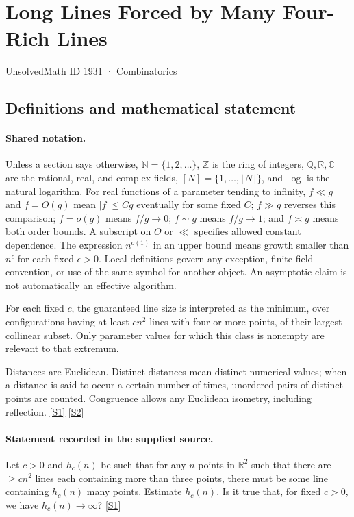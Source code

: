 \documentclass[11pt,a4paper]{article}
\newcommand{\N}{\mathbb{N}}
\newcommand{\Z}{\mathbb{Z}}
\newcommand{\Q}{\mathbb{Q}}
\newcommand{\R}{\mathbb{R}}
\newcommand{\C}{\mathbb{C}}
\newcommand{\sref}[2]{\hyperlink{source:#1:#2}{[S#2]}}
\begin{document}

\setcounter{section}{1930}

\section{Long Lines Forced by Many Four-Rich Lines}\label{1931}

{\small\sffamily UnsolvedMath ID 1931 · Combinatorics}

\subsection{Definitions and mathematical statement}

\paragraph{Shared notation.}Unless a section says otherwise, $\N=\{1,2,\ldots\}$,
$\Z$ is the ring of integers, $\Q,\R,\C$ are the rational, real, and complex
fields, $[N]=\{1,\ldots,\lfloor N\rfloor\}$, and $\log$ is the natural
logarithm. For real functions of a parameter tending to infinity,
$f\ll g$ and $f=O(g)$ mean $|f|\leq Cg$ eventually for some fixed $C$;
$f\gg g$ reverses this comparison; $f=o(g)$ means $f/g\to0$;
$f\sim g$ means $f/g\to1$; and $f\asymp g$ means both order bounds.
A subscript on $O$ or $\ll$ specifies allowed constant dependence.
The expression $n^{o(1)}$ in an upper bound means growth smaller than
$n^\epsilon$ for each fixed $\epsilon>0$. Local definitions govern any
exception, finite-field convention, or use of the same symbol for another
object. An asymptotic claim is not automatically an effective algorithm.



For each fixed $c$, the guaranteed line size is interpreted as the minimum, over configurations having at least $cn^2$ lines with four or more points, of their largest collinear subset. Only parameter values for which this class is nonempty are relevant to that extremum.

Distances are Euclidean. Distinct distances mean distinct numerical values; when a distance is said to occur a certain number of times, unordered pairs of distinct points are counted. Congruence allows any Euclidean isometry, including reflection. \sref{1931}{1} \sref{1931}{2}

\paragraph{Statement recorded in the supplied source.}
Let $c>0$ and $h_c(n)$ be such that for any $n$ points in $\mathbb{R}^2$ such that there are $\geq cn^2$ lines each containing more than three points, there must be some line containing $h_c(n)$ many points. Estimate $h_c(n)$. Is it true that, for fixed $c>0$, we have $h_c(n)\to \infty$? \sref{1931}{1}
\end{document}
